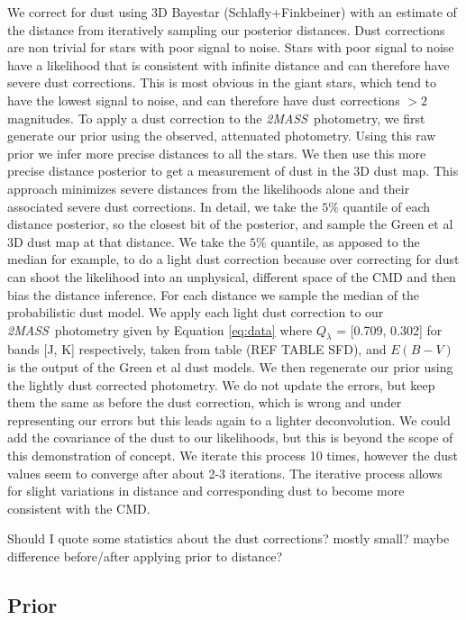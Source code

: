 \documentclass[modern]{aastex61}
\newcommand{\acronym}[1]{{\small{#1}}}
\newcommand{\project}[1]{\textsl{#1}}
\newcommand{\tmass}{\project{\acronym{2MASS}}}
\newcommand{\cmd}{\acronym{CMD}}
\begin{document}
We correct for dust using 3D Bayestar (Schlafly+Finkbeiner) with an estimate of the distance from iteratively sampling our posterior distances. Dust corrections are non trivial for stars with poor signal to noise. Stars with poor signal to noise have a likelihood that is consistent with infinite distance and can therefore have severe dust corrections. This is most obvious in the giant stars, which tend to have the lowest signal to noise, and can therefore have dust corrections $> 2$ magnitudes. To apply a dust correction to the \tmass\ photometry, we first generate our prior using the observed, attenuated photometry. Using this raw prior we infer more precise distances to all the stars. We then use this more precise distance posterior to get a measurement of dust in the 3D dust map. This approach minimizes severe distances from the likelihoods alone and their associated severe dust corrections. In detail, we take the $5\%$ quantile of each distance posterior, so the closest bit of the posterior, and sample the Green et al 3D dust map at that distance. We take the $5\%$ quantile, as apposed to the median for example, to do a light dust correction because over correcting for dust can shoot the likelihood into an unphysical, different space of the CMD and then bias the distance inference. For each distance we sample the median of the probabilistic dust model. We apply each light dust correction to our \tmass\ photometry given by Equation \ref{eq:data} where $Q_{\lambda}$ = [0.709, 0.302] for bands [J, K] respectively, taken from table (REF TABLE SFD), and $E(B-V)$ is the output of the Green et al dust models. We then regenerate our prior using the lightly dust corrected photometry. We do not update the errors, but keep them the same as before the dust correction, which is wrong and under representing our errors but this leads again to a lighter deconvolution. We could add the covariance of the dust to our likelihoods, but this is beyond the scope of this demonstration of concept. We iterate this process 10 times, however the dust values seem to converge after about 2-3 iterations. The iterative process allows for slight variations in distance and corresponding dust to become more consistent with the \cmd.

Should I quote some statistics about the dust corrections? mostly small? maybe difference before/after applying prior to distance?

\subsection{Prior}
\end{document}
